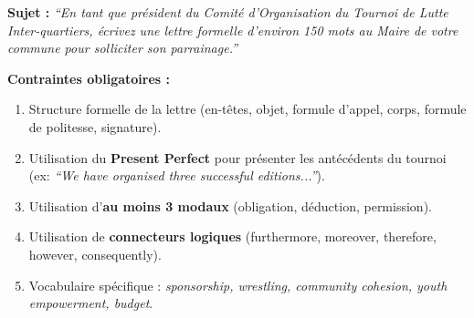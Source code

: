 \documentclass[11pt]{article}
\begin{document}
\begin{exercice}
\textbf{Sujet :} \emph{``En tant que président du Comité d'Organisation du Tournoi de Lutte Inter-quartiers, écrivez une lettre formelle d'environ 150 mots au Maire de votre commune pour solliciter son parrainage.''}

\textbf{Contraintes obligatoires :}
\begin{enumerate}
\item Structure formelle de la lettre (en-têtes, objet, formule d'appel, corps, formule de politesse, signature).
\item Utilisation du \textbf{Present Perfect} pour présenter les antécédents du tournoi (ex: \emph{``We have organised three successful editions...''}).
\item Utilisation d'\textbf{au moins 3 modaux} (obligation, déduction, permission).
\item Utilisation de \textbf{connecteurs logiques} (furthermore, moreover, therefore, however, consequently).
\item Vocabulaire spécifique : \emph{sponsorship, wrestling, community cohesion, youth empowerment, budget}.
\end{enumerate}
\end{exercice}
\end{document}
